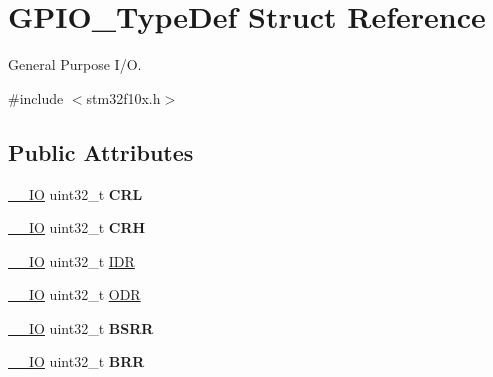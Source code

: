 \hypertarget{struct_g_p_i_o___type_def}{\section{G\-P\-I\-O\-\_\-\-Type\-Def Struct Reference}
\label{struct_g_p_i_o___type_def}
}


General Purpose I/\-O.  




{\ttfamily \#include $<$stm32f10x.\-h$>$}

\subsection*{Public Attributes}
\begin{DoxyCompactItemize}
\item 
\hypertarget{struct_g_p_i_o___type_def_a218d21e9ca712cec4ca8f00406b2ec29}{\hyperlink{group___c_m_s_i_s__core__definitions_gaec43007d9998a0a0e01faede4133d6be}{\-\_\-\-\_\-\-I\-O} uint32\-\_\-t {\bfseries C\-R\-L}}\label{struct_g_p_i_o___type_def_a218d21e9ca712cec4ca8f00406b2ec29}

\item 
\hypertarget{struct_g_p_i_o___type_def_afe53502a3dbf9e7dcf9ac83f67ac481d}{\hyperlink{group___c_m_s_i_s__core__definitions_gaec43007d9998a0a0e01faede4133d6be}{\-\_\-\-\_\-\-I\-O} uint32\-\_\-t {\bfseries C\-R\-H}}\label{struct_g_p_i_o___type_def_afe53502a3dbf9e7dcf9ac83f67ac481d}

\item 
\hyperlink{group___c_m_s_i_s__core__definitions_gaec43007d9998a0a0e01faede4133d6be}{\-\_\-\-\_\-\-I\-O} uint32\-\_\-t \hyperlink{struct_g_p_i_o___type_def_acf11156409414ad8841bb0b62959ee96}{I\-D\-R}
\item 
\hyperlink{group___c_m_s_i_s__core__definitions_gaec43007d9998a0a0e01faede4133d6be}{\-\_\-\-\_\-\-I\-O} uint32\-\_\-t \hyperlink{struct_g_p_i_o___type_def_a6fb78f4a978a36032cdeac93ac3c9c8b}{O\-D\-R}
\item 
\hypertarget{struct_g_p_i_o___type_def_acd6f21e08912b484c030ca8b18e11cd6}{\hyperlink{group___c_m_s_i_s__core__definitions_gaec43007d9998a0a0e01faede4133d6be}{\-\_\-\-\_\-\-I\-O} uint32\-\_\-t {\bfseries B\-S\-R\-R}}\label{struct_g_p_i_o___type_def_acd6f21e08912b484c030ca8b18e11cd6}

\item 
\hypertarget{struct_g_p_i_o___type_def_aab918bfbfae459789db1fd0b220c7f21}{\hyperlink{group___c_m_s_i_s__core__definitions_gaec43007d9998a0a0e01faede4133d6be}{\-\_\-\-\_\-\-I\-O} uint32\-\_\-t {\bfseries B\-R\-R}}\label{struct_g_p_i_o___type_def_aab918bfbfae459789db1fd0b220c7f21}


\end{DoxyCompactItemize}
